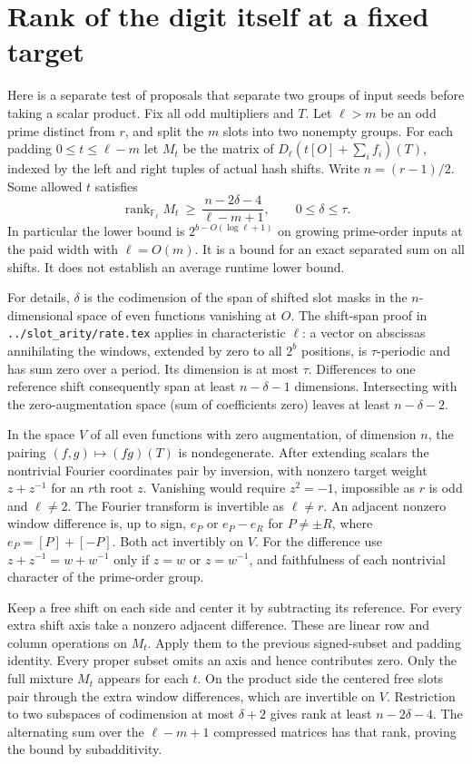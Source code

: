 \documentclass[11pt]{article}
\begin{document}
\section{Rank of the digit itself at a fixed target}
Here is a separate test of proposals that separate two groups of input
seeds before taking a scalar product. Fix all odd multipliers and $T$.
Let $\ell>m$ be an odd prime distinct from $r$, and split the $m$ slots
into two nonempty groups. For each padding $0\le t\le\ell-m$ let $M_t$ be
the matrix of $D_\ell(t[O]+\sum_i f_i)(T)$, indexed by the left
and right tuples of actual hash shifts. Write $n=(r-1)/2$.
Some allowed $t$ satisfies
\[
 \operatorname{rank}_{\mathbb F_\ell} M_t
   \ \ge\ \frac{n-2\delta-4}{\ell-m+1},\qquad 0\le\delta\le\tau .
\]
In particular the lower bound is $2^{b-O(\log\ell+1)}$ on growing
prime-order inputs at the paid width with $\ell=O(m)$. It is a bound
for an exact separated sum on all shifts. It does not establish
an average runtime lower bound.

For details, $\delta$ is the codimension of the span of shifted slot
masks in the $n$-dimensional space of even functions vanishing at
$O$. The shift-span proof in \texttt{../slot\_arity/rate.tex} applies
in characteristic $\ell$: a vector on abscissas annihilating the
windows, extended by zero to all $2^b$ positions, is $\tau$-periodic
and has sum zero over a period. Its dimension is at most $\tau$.
Differences to one reference shift consequently span at least
$n-\delta-1$ dimensions. Intersecting with the zero-augmentation
space (sum of coefficients zero) leaves at least $n-\delta-2$.

In the space $V$ of all even functions with zero augmentation, of
dimension $n$, the pairing $(f,g)\mapsto(fg)(T)$ is nondegenerate.
After extending scalars the nontrivial Fourier coordinates pair by
inversion, with nonzero target weight $z+z^{-1}$ for an $r$th root
$z$. Vanishing would require $z^2=-1$, impossible as $r$ is odd
and $\ell\ne2$. The Fourier transform is invertible as $\ell\ne r$.
An adjacent nonzero window difference is, up to sign, $e_P$ or
$e_P-e_R$ for $P\ne\pm R$, where $e_P=[P]+[-P]$.
Both act invertibly on $V$. For the difference use
$z+z^{-1}=w+w^{-1}$ only if $z=w$ or $z=w^{-1}$, and faithfulness
of each nontrivial character of the prime-order group.

Keep a free shift on each side and center it by subtracting its
reference. For every extra shift axis take a nonzero adjacent
difference. These are linear row and column operations on $M_t$.
Apply them to the previous signed-subset and padding identity.
Every proper subset omits an axis and hence contributes zero.
Only the full mixture $M_t$ appears for each $t$. On the product
side the centered free slots pair through the extra window
differences, which are invertible on $V$. Restriction to two
subspaces of codimension at most $\delta+2$ gives rank at least
$n-2\delta-4$. The alternating sum over the $\ell-m+1$ compressed
matrices has that rank, proving the bound by subadditivity.
\end{document}
